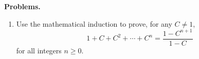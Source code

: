 \documentclass[10pt]{article}
\title{}
\date{}
\begin{document}
\noindent
{\bf Problems.}
\begin{enumerate}
\item
Use the mathematical induction to prove, for any $C \ne 1$, 
\[
1 + C + C^2 + \cdots + C^{n} = \frac{1-C^{n+1}}{1-C}
\]
for all integers $n\geq0$.
\end{enumerate}
\end{document}
